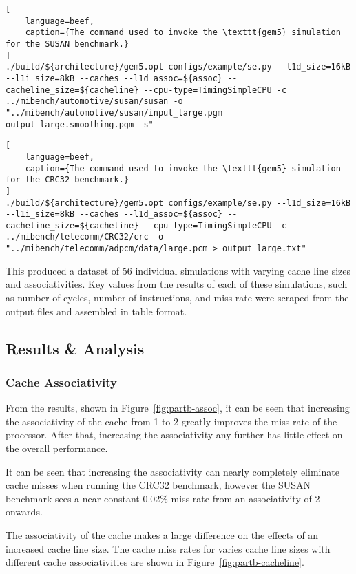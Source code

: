 \begin{lstlisting}[
    language=beef,
    caption={The command used to invoke the \texttt{gem5} simulation for the SUSAN benchmark.}
]
./build/${architecture}/gem5.opt configs/example/se.py --l1d_size=16kB --l1i_size=8kB --caches --l1d_assoc=${assoc} --cacheline_size=${cacheline} --cpu-type=TimingSimpleCPU -c ../mibench/automotive/susan/susan -o "../mibench/automotive/susan/input_large.pgm output_large.smoothing.pgm -s"
\end{lstlisting}

\begin{lstlisting}[
    language=beef,
    caption={The command used to invoke the \texttt{gem5} simulation for the CRC32 benchmark.}
]
./build/${architecture}/gem5.opt configs/example/se.py --l1d_size=16kB --l1i_size=8kB --caches --l1d_assoc=${assoc} --cacheline_size=${cacheline} --cpu-type=TimingSimpleCPU -c ../mibench/telecomm/CRC32/crc -o "../mibench/telecomm/adpcm/data/large.pcm > output_large.txt"
\end{lstlisting}

This produced a dataset of 56 individual simulations with varying cache line sizes and
associativities.
Key values from the results of each of these simulations, such as number of cycles,
number of instructions, and miss rate were scraped from the output files and assembled 
in table format.

\subsection{Results \& Analysis}

\subsubsection{Cache Associativity}

From the results, shown in Figure~\ref{fig:partb-assoc},
it can be seen that increasing the associativity of the cache from 
1 to 2 greatly improves the miss rate of the processor. After that, increasing the 
associativity any further has little effect on the overall performance.

It can be seen that increasing the associativity can nearly completely eliminate
cache misses when running the CRC32 benchmark, however the SUSAN benchmark sees a near
constant 0.02\% miss rate from an associativity of 2 onwards.

The associativity of the cache makes a large difference on the effects of an increased cache
line size.
The cache miss rates for varies cache line sizes with different cache associativities are
shown in Figure~\ref{fig:partb-cacheline}.

